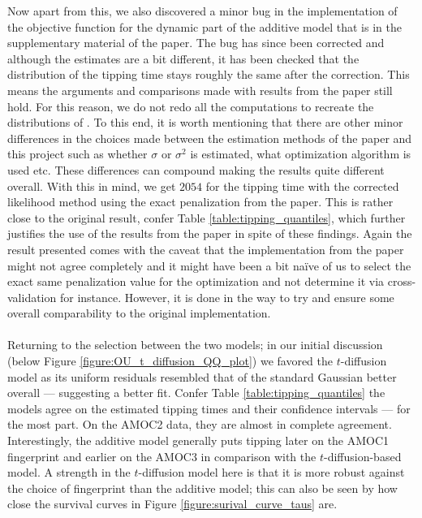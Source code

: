Now apart from this, we also discovered a minor bug in the implementation of the objective function for the dynamic part of the additive model that is in the supplementary material of the paper. The bug has since been corrected and although the estimates are a bit different, it has been checked that the distribution of the tipping time stays roughly the same after the correction. This means the arguments and comparisons made with results from the paper still hold. For this reason, we do not redo all the computations to recreate the distributions of \cite{Ditlevsen2023}. To this end, it is worth mentioning that there are other minor differences in the choices made between the estimation methods of the paper and this project such as whether $\sigma$ or $\sigma^2$ is estimated, what optimization algorithm is used etc. These differences can compound making the results quite different overall. With this in mind, we get $2054$ for the tipping time with the corrected likelihood method using the exact penalization from the paper. This is rather close to the original result, confer Table \ref{table:tipping_quantiles}, which further justifies the use of the results from the paper in spite of these findings. Again the result presented comes with the caveat that the implementation from the paper might not agree completely and it might have been a bit naïve of us to select the exact same penalization value for the optimization and not determine it via cross-validation for instance. However, it is done in the way to try and ensure some overall comparability to the original implementation.\\\\
Returning to the selection between the two models; in our initial discussion (below Figure \ref{figure:OU_t_diffusion_QQ_plot}) we favored the $t$-diffusion model as its uniform residuals resembled that of the standard Gaussian better overall — suggesting a better fit. Confer Table \ref{table:tipping_quantiles} the models agree on the estimated tipping times and their confidence intervals — for the most part. On the AMOC2 data, they are almost in complete agreement. Interestingly, the additive model generally puts tipping later on the AMOC1 fingerprint and earlier on the AMOC3 in comparison with the $t$-diffusion-based model. A strength in the $t$-diffusion model here is that it is more robust against the choice of fingerprint than the additive model; this can also be seen by how close the survival curves in Figure \ref{figure:surival_curve_taus} are.

